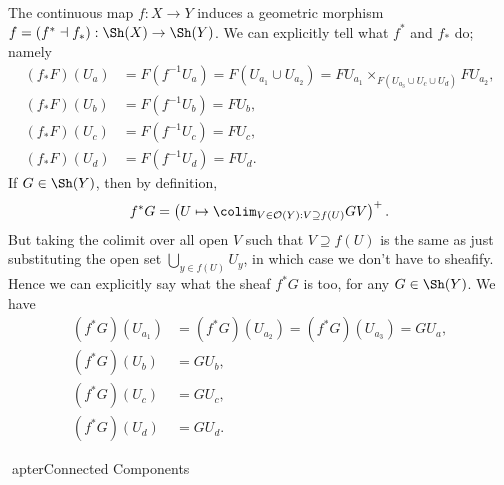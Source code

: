 The continuous map $f : X \to Y$ induces a geometric morphism $f = (f^* \dashv f_*) : \Sh(X) \to \Sh(Y)$. We can explicitly tell what $f^*$ and $f_*$ do; namely
\begin{align*}
(f_*F)(U_a) &= F(f^{-1}U_a) = F\left( U_{a_1} \cup U_{a_2}\right) = FU_{a_1} \times_{F(U_{a_3} \cup U_c \cup U_d)} FU_{a_2}, \\
(f_*F)(U_b) &= F(f^{-1}U_b) = FU_b, \\
(f_*F)(U_c) &= F(f^{-1}U_c) = FU_c, \\
(f_*F)(U_d) &= F(f^{-1}U_d) = FU_d.
\end{align*}
If $G \in \Sh(Y)$, then by definition,
\[ f^*G = \left( U \mapsto \colim_{V \in \mathcal{O}(Y) : V \supseteq f(U)} GV \right)^+. \]
But taking the colimit over all open $V$ such that $V \supseteq f(U)$ is the same as just substituting the open set $\bigcup_{y \in f(U)} U_y$, in which case we don't have to sheafify. Hence we can explicitly say what the sheaf $f^*G$ is too, for any $G \in \Sh(Y)$. We have
\begin{align*}
(f^*G)(U_{a_1}) &= (f^*G)(U_{a_2}) = (f^*G)(U_{a_3}) = GU_a, \\
(f^*G)(U_b) &= GU_b, \\
(f^*G)(U_c) &= GU_c, \\
(f^*G)(U_d) &= GU_d.
\end{align*}

apter{Connected Components}

